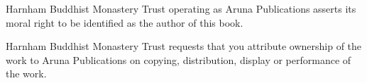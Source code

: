 {Harnham Buddhist Monastery Trust operating as Aruna Publications asserts its moral right to be identified as the author of this book.
\bigskip

Harnham Buddhist Monastery Trust requests that you attribute ownership of the work to Aruna Publications on copying, distribution, display or performance of the work.

}
